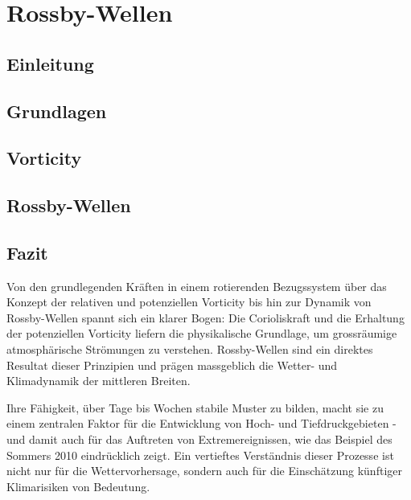%
%
%

\chapter{Rossby-Wellen\label{chapter:rossby}}
\begin{refsection}

    \section{Einleitung}
    
    \section{Grundlagen}
    
    \section{Vorticity}
    
    \section{Rossby-Wellen}
    


	\section{Fazit}

	Von den grundlegenden Kräften in einem rotierenden Bezugssystem über das Konzept der relativen und potenziellen Vorticity bis hin zur Dynamik von Rossby-Wellen spannt sich ein klarer Bogen:
	Die Corioliskraft und die Erhaltung der potenziellen Vorticity liefern die physikalische Grundlage, um grossräumige atmosphärische Strömungen zu verstehen.
	Rossby-Wellen sind ein direktes Resultat dieser Prinzipien und prägen massgeblich die Wetter- und Klimadynamik der mittleren Breiten.

	Ihre Fähigkeit, über Tage bis Wochen stabile Muster zu bilden, macht sie zu einem zentralen Faktor für die Entwicklung von Hoch- und Tiefdruckgebieten - und damit auch für das Auftreten von Extremereignissen, wie das Beispiel des Sommers 2010 eindrücklich zeigt.
	Ein vertieftes Verständnis dieser Prozesse ist nicht nur für die Wettervorhersage, sondern auch für die Einschätzung künftiger Klimarisiken von Bedeutung.


	\printbibliography[heading=subbibliography]
\end{refsection}

